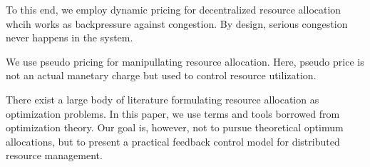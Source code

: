 To this end, we employ dynamic pricing for decentralized resource
allocation whcih works as backpressure against congestion.
By design, serious congestion never happens in the system.

We use pseudo pricing for manipullating resource allocation.
Here, pseudo price is not an actual manetary charge but used to
control resource utilization.

There exist a large body of literature formulating resource allocation
as optimization problems.
In this paper, we use terms and tools borrowed from optimization
theory. Our goal is, however, not to pursue theoretical optimum
allocations, but to present a practical feedback control model for
distributed resource management.


